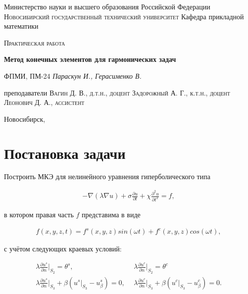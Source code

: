 \documentclass[12pt]{article}
\begin{document}
\begin{titlepage}
\centering

{Министерство науки и высшего образования Российской Федерации}
\vskip 2mm
{\large\scshape Новосибирский государственный технический университет}
\vskip 2mm
{Кафедра прикладной математики}

\vfill
\vskip 3cm

{\scshape Практическая работа }
\vskip 3mm
\begin{spacing}{1.7}
    {\huge\bf Метод конечных элементов для гармонических задач}
\end{spacing}
\vskip 5mm
{\scriptsize ФПМИ, ПМ-24}
\vskip 2mm
{\large\it Параскун И., Герасименко В.}

\vfill

{преподаватели}
\vskip 2mm
{\scshape Вагин Д. В., д.т.н., доцент}
\vskip 1mm
{\scshape Задорожный А. Г., к.т.н., доцент}
\vskip 1mm
{\scshape Леонович Д. А., ассистент}

\vfill

{Новосибирск, \the\year}

\end{titlepage}

\setcounter{page}{2}

\section{Постановка задачи}

\noindent Построить МКЭ для нелинейного уравнения гиперболического типа

\begin{align}
  \label{eq:1} -\nabla(\lambda\nabla u) 
    + \sigma\frac{\partial u}{\partial t}
    + \chi\frac{\partial^2u}{\partial t^2} = f,
\end{align}

\vskip 4mm
\noindent в котором правая часть $f$ представима в виде

\begin{align}
  f(x, y, z, t) = f^s(x, y, z)sin(\omega t) + f^c(x, y, z)cos(\omega t),
\end{align}

\vskip 4mm
\noindent с учётом следующих краевых условий:

\begin{align}
  \lambda\frac{\partial u^s}{\partial n} \bigg|_{S_2} = \theta^s,\ \  &
  \lambda\frac{\partial u^c}{\partial n} \bigg|_{S_2} = \theta^c \\
  \lambda\frac{\partial u^s}{\partial n} \bigg|_{S_3} + \beta(u^s|_{S_3} - u^s_{\beta}) = 0,\ \  &
  \lambda\frac{\partial u^c}{\partial n} \bigg|_{S_3} + \beta(u^c|_{S_3} - u^c_{\beta}) = 0.
\end{align}
\end{document}
